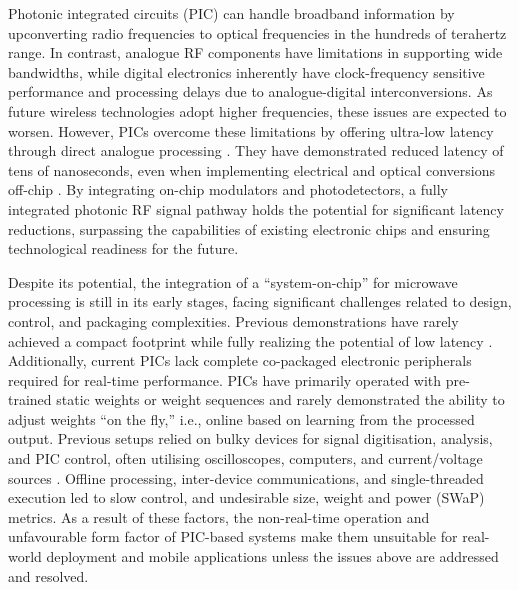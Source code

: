 \documentclass[pdflatex,mathphys]{sty}%
\begin{document}
Photonic integrated circuits (PIC) can handle broadband information by upconverting radio frequencies to optical frequencies in the hundreds of terahertz range. In contrast, analogue RF components have limitations in supporting wide bandwidths, while digital electronics inherently have clock-frequency sensitive performance and processing delays due to analogue-digital interconversions. As future wireless technologies adopt higher frequencies, these issues are expected to worsen. However, PICs overcome these limitations by offering ultra-low latency through direct analogue processing \cite{yang2022multi,daulay2022ultrahigh,huang2021silicon,shastri2021photonics,hu2020reconfigurable,marpaung2019integrated,perez2017multipurpose,wang2015reconfigurable,ghelfi2014fully}. They have demonstrated reduced latency of tens of nanoseconds, even when implementing electrical and optical conversions off-chip \cite{zhang2022broadband,lederman2023real}. By integrating on-chip modulators and photodetectors, a fully integrated photonic RF signal pathway holds the potential for significant latency reductions, surpassing the capabilities of existing electronic chips and ensuring technological readiness for the future.

Despite its potential, the integration of a ``system-on-chip'' for microwave processing is still in its early stages, facing significant challenges related to design, control, and packaging complexities. Previous demonstrations have rarely achieved a compact footprint while fully realizing the potential of low latency \cite{bogaerts2020programmable,perez2020multipurpose}. Additionally, current PICs lack complete co-packaged electronic peripherals required for real-time performance. PICs have primarily operated with pre-trained static weights or weight sequences and rarely demonstrated the ability to adjust weights ``on the fly,'' i.e., online based on learning from the processed output. Previous setups relied on bulky devices for signal digitisation, analysis, and PIC control, often utilising oscilloscopes, computers, and current/voltage sources \cite{zhang2022broadband,ghelfi2014fully}. Offline processing, inter-device communications, and single-threaded execution led to slow control, and undesirable size, weight and power (SWaP) metrics. As a result of these factors, the non-real-time operation and unfavourable form factor of PIC-based systems make them unsuitable for real-world deployment and mobile applications unless the issues above are addressed and resolved.
\end{document}
